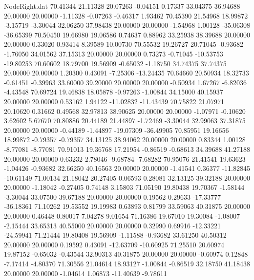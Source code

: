\begin{filecontents}{NodeRight.dat}
  70.41344   21.11328   20.07263    -0.04151    0.17337   33.04375   36.94688   20.00000   20.00000   -1.11328   -0.07263   -0.46317    1.93462
  70.45390   21.54968   18.99872    -3.15719   -3.30044   32.06250   37.98438   20.00000   20.00000   -1.54968    1.00128  -35.06308  -36.65399
  70.50450   19.66980   19.06586     0.74637    0.88962   33.25938   38.39688   20.00000   20.00000    0.33020    0.93414    8.39589   10.00730
  70.55532   19.26727   20.71045    -0.93682   -1.76050   34.01562   37.15313   20.00000   20.00000    0.73273   -0.71045  -10.53753  -19.80253
  70.60602   18.79700   19.56909    -0.65032   -1.18750   34.74375   37.74375   20.00000   20.00000    1.20300    0.43091   -7.25306  -13.24435
  70.64660   20.50934   18.32733    -0.61451   -0.39963   33.60000   39.20000   20.00000   20.00000   -0.50934    1.67267   -6.82036   -4.43548
  70.69724   19.46838   18.05878    -0.97263   -1.00844   34.15000   40.15937   20.00000   20.00000    0.53162    1.94122  -11.02832  -11.43439
  70.75822   21.07971   20.10620     0.31662    0.49568   32.97813   38.90625   20.00000   20.00000   -1.07971   -0.10620    3.62602    5.67670
  70.80886   20.44189   21.44897    -1.72469   -3.30044   32.99063   37.31875   20.00000   20.00000   -0.44189   -1.44897  -19.07309  -36.49905
  70.85951   19.16656   18.99872    -0.79357   -0.79357   34.13125   38.94062   20.00000   20.00000    0.83344    1.00128   -8.77081   -8.77081
  70.91013   19.36768   17.21954    -0.86519   -0.68613   34.39688   41.27188   20.00000   20.00000    0.63232    2.78046   -9.68784   -7.68282
  70.95076   21.41541   19.63623    -1.04426   -0.93682   32.66250   40.16563   20.00000   20.00000   -1.41541    0.36377  -11.82845  -10.61149
  71.00134   21.18042   20.27405     0.06593    0.28081   32.13125   39.32188   20.00000   20.00000   -1.18042   -0.27405    0.74148    3.15803
  71.05190   19.80438   19.70367    -1.58144   -3.30044   33.07500   39.67188   20.00000   20.00000    0.19562    0.29633  -17.33777  -36.18361
  71.10262   19.53552   19.19983     0.63893    0.81799   33.59063   40.31875   20.00000   20.00000    0.46448    0.80017    7.04278    9.01654
  71.16386   19.67010   19.30084    -1.08007   -2.15444   33.65313   40.55000   20.00000   20.00000    0.32990    0.69916  -12.33221  -24.59941
  71.21444   19.80408   19.56909    -1.11588   -0.93682   33.61250   40.50312   20.00000   20.00000    0.19592    0.43091  -12.63709  -10.60925
  71.25510   20.60974   19.87152    -0.65032   -0.43544   32.90313   40.31875   20.00000   20.00000   -0.60974    0.12848   -7.17414   -4.80370
  71.30556   21.04614   18.93127    -1.00844   -0.86519   32.18750   41.18438   20.00000   20.00000   -1.04614    1.06873  -11.40639   -9.78611

\end{filecontents}
